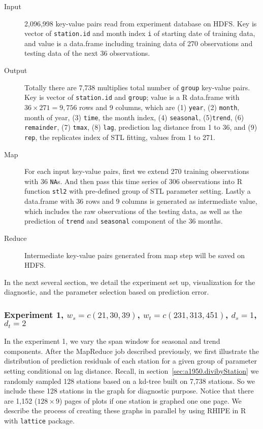 \begin{description}
  \item[Input] 2,096,998 key-value pairs read from experiment database on HDFS.
  Key is vector of \texttt{station.id} and month index \texttt{i} of starting date
  of training data, and value is a data.frame including training data of 270 
  observations and testing data of the next 36 observations.
  \item[Output] Totally there are 7,738 multiplies total number of \texttt{group} 
  key-value pairs. 
  Key is vector of \texttt{station.id} and \texttt{group}; value is a R data.frame
  with $36 \times 271 = 9,756$ rows and 9 columns, which are (1) \texttt{year},
  (2) \texttt{month}, month of year, (3) \texttt{time}, the month index, (4) 
  \texttt{seasonal}, (5)\texttt{trend}, (6) \texttt{remainder}, (7) \texttt{tmax},
  (8) \texttt{lag}, prediction lag distance from 1 to 36, and (9) \texttt{rep},
  the replicates index of STL fitting, values from 1 to 271. 
  \item[Map] For each input key-value pairs, first we extend 270 training 
  observations with 36 \texttt{NA}s. And then pass this time series of 306 
  observations into R function \texttt{stl2} with pre-defined group of STL 
  parameter setting. Lastly a data.frame with 36 rows and 9 columns is generated
  as intermediate value, which includes the raw observations of the testing data, 
  as well as the prediction of \texttt{trend} and \texttt{seasonal} component of 
  the 36 months.
  \item[Reduce] Intermediate key-value pairs generated from map step will be saved
  on HDFS.
\end{description} 

In the next several section, we detail the experiment set up, visualization for 
the diagnostic, and the parameter selection based on prediction error.

\subsubsection{Experiment 1,  
\textmd{$w_s=c(21, 30, 39)$, $w_t=c(231, 313, 451)$, $d_s=1$, $d_t=2$}
}

In the experiment 1, we vary the span window for seasonal and trend components. 
After the MapReduce job described previously, we first illustrate the distribution
of prediction residuals of each station for a given group of parameter setting
conditional on lag distance. Recall, in section~\ref{sec:a1950.divibyStation} we
randomly sampled 128 stations based on a kd-tree built on 7,738 stations. So we 
include these 128 stations in the graph for diagnostic purpose. Notice that there
are 1,152 ($128 \times 9$) pages of plots if one station is graphed one one page.
We describe the process of creating these graphs in parallel by using RHIPE in R
with \texttt{lattice} package.

